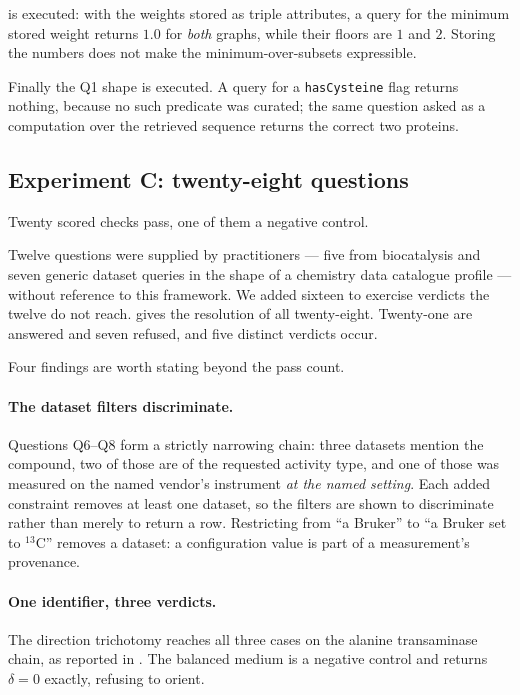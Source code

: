 \documentclass[11pt,twocolumn,a4paper]{article}
\theoremstyle{thmstyle}
\theoremstyle{definition}
\theoremstyle{remark}
\begin{document}
 is executed: with the weights stored as triple
attributes, a query for the minimum stored weight returns $1.0$ for
\emph{both} graphs, while their floors are $1$ and $2$. Storing the numbers
does not make the minimum-over-subsets expressible.

Finally the Q1 shape is executed. A query for a \texttt{hasCysteine} flag
returns nothing, because no such predicate was curated; the same question
asked as a computation over the retrieved sequence returns the correct two
proteins.

\subsection{Experiment C: twenty-eight questions}
\label{sec:res-c}\label{sec:questions}

Twenty scored checks pass, one of them a negative control.

Twelve questions were supplied by practitioners --- five from biocatalysis and
seven generic dataset queries in the shape of a chemistry data catalogue
profile --- without reference to this framework. We added sixteen to exercise
verdicts the twelve do not reach.  gives the resolution of
all twenty-eight. Twenty-one are answered and seven refused, and five distinct
verdicts occur.

Four findings are worth stating beyond the pass count.

\paragraph{The dataset filters discriminate.} Questions Q6--Q8 form a strictly
narrowing chain: three datasets mention the compound, two of those are of the
requested activity type, and one of those was measured on the named vendor's
instrument \emph{at the named setting}. Each added constraint removes at least
one dataset, so the filters are shown to discriminate rather than merely to
return a row. Restricting from ``a Bruker'' to ``a Bruker set to
$^{13}\mathrm{C}$'' removes a dataset: a configuration value is part of a
measurement's provenance.

\paragraph{One identifier, three verdicts.} The direction trichotomy reaches
all three cases on the alanine transaminase chain, as reported in
. The balanced medium is a negative control and returns
$\delta=0$ exactly, refusing to orient.
\end{document}
